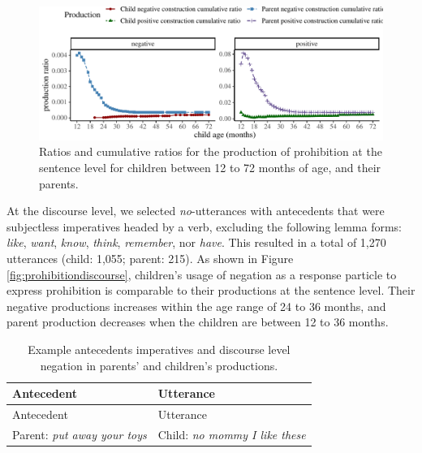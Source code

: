 \documentclass[
  english,
  man,floatsintext]{apa6}
\begin{document}
\begin{figure}[H]

{\centering \includegraphics{neg_construction_article_files/figure-latex/prohibition-1} 

}

\caption{Ratios and cumulative ratios for the production of prohibition at the sentence level for children between 12 to 72 months of age, and their parents.}\label{fig:prohibition}
\end{figure}

At the discourse level, we selected \emph{no}-utterances with antecedents that were subjectless imperatives headed by a verb, excluding the following lemma forms: \emph{like}, \emph{want}, \emph{know}, \emph{think}, \emph{remember}, nor \emph{have}. This resulted in a total of 1,270 utterances (child: 1,055; parent: 215). As shown in Figure \ref{fig:prohibitiondiscourse}, children's usage of negation as a response particle to express prohibition is comparable to their productions at the sentence level. Their negative productions increases within the age range of 24 to 36 months, and parent production decreases when the children are between 12 to 36 months.

\begin{longtable}[]{@{}ll@{}}
\caption{\label{tab:disprohib} Example antecedents imperatives and discourse level negation in parents' and children's productions.}\tabularnewline
\toprule
Antecedent & Utterance \\
\midrule
\endfirsthead
\toprule
Antecedent & Utterance \\
\midrule
\endhead
Parent: \emph{put away your toys} & Child: \emph{no mommy I like these} \\
\bottomrule
\end{longtable}
\end{document}
